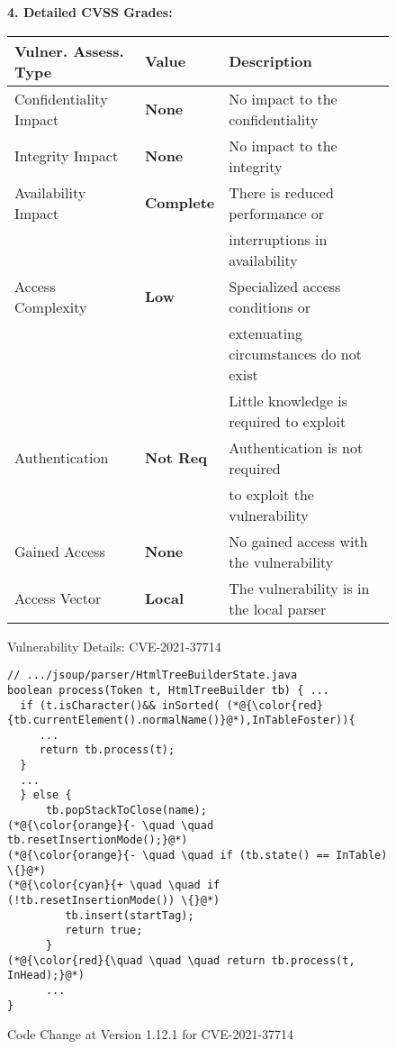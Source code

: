\begin{figure}[t]
\begin{flushleft}
{\bf 4. Detailed CVSS Grades:}\\
\end{flushleft}
  \centering
  \tabcolsep 3pt
  \footnotesize
  \begin{tabular}{lll}
   Vulner. Assess. Type   & Value & Description \\
      \hline
    Confidentiality Impact & {\bf None}  & No impact to the confidentiality \\
    Integrity Impact & {\bf None}  & No impact to the integrity \\
    Availability Impact & {\bf Complete} & There is reduced performance or\\
    & & interruptions in availability\\
    Access Complexity & {\bf Low} & Specialized access conditions or \\
    & & extenuating circumstances do not exist\\
    & & Little knowledge is required to exploit\\
    Authentication & {\bf Not Req} & Authentication is not required \\
    & & to exploit the vulnerability\\
    Gained Access & {\bf None}  & No gained access with the vulnerability \\
    Access Vector & {\bf Local} & The vulnerability is in the local parser \\
    \end{tabular}%
  \label{CVSS:tab}%
\caption{Vulnerability Details: CVE-2021-37714}
\label{CVSS-tab}
\end{figure}

\begin{figure}[t]
	\centering
	\begin{lstlisting}[]
// .../jsoup/parser/HtmlTreeBuilderState.java
boolean process(Token t, HtmlTreeBuilder tb) { ...
  if (t.isCharacter()&& inSorted( (*@{\color{red}{tb.currentElement().normalName()}@*),InTableFoster)){
     ...
     return tb.process(t);
  }
  ...
  } else {
      tb.popStackToClose(name);
(*@{\color{orange}{- \quad \quad tb.resetInsertionMode();}@*)
(*@{\color{orange}{- \quad \quad if (tb.state() == InTable) \{}@*)
(*@{\color{cyan}{+ \quad \quad if (!tb.resetInsertionMode()) \{}@*)
         tb.insert(startTag);
         return true;
      }
(*@{\color{red}{\quad \quad \quad return tb.process(t, InHead);}@*)
      ...
}
	\end{lstlisting}
        \vspace{-15pt}
        \caption{Code Change at Version 1.12.1 for CVE-2021-37714}
        \vspace{-6pt}
        \label{fig:motiv-code}
\end{figure}

